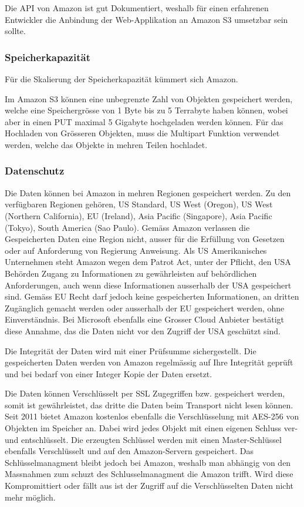 Die API von Amazon ist gut Dokumentiert, weshalb für einen erfahrenen Entwickler die Anbindung der Web-Applikation an Amazon S3 umsetzbar sein sollte.

\subsubsection*{Speicherkapazität}
Für die Skalierung der Speicherkapazität kümmert sich Amazon.

Im Amazon S3 können eine unbegrenzte Zahl von Objekten gespeichert werden, welche eine Speichergrösse von 1 Byte bis zu 5 Terrabyte haben können, wobei aber in einen PUT maximal 5 Gigabyte hochgeladen werden können. Für das Hochladen von Grösseren Objekten, muss die Multipart Funktion verwendet werden, welche das Objekte in mehren Teilen hochladet.\cite{Amazon2012b}

\subsubsection*{Datenschutz}
Die Daten können bei Amazon in mehren Regionen gespeichert werden. Zu den verfügbaren Regionen gehören, US Standard, US West (Oregon), US West (Northern California), EU (Ireland), Asia Pacific (Singapore), Asia Pacific (Tokyo), South America (Sao Paulo). Gemäss Amazon verlassen die Gespeicherten Daten eine Region nicht, ausser für die Erfüllung von Gesetzen oder auf Anforderung von Regierung Anweisung. Als US Amerikanisches Unternehmen steht Amazon wegen dem Patrot Act, unter der Pflicht, den USA Behörden Zugang zu Informationen zu gewährleisten auf behördlichen Anforderungen, auch wenn diese Informationen ausserhalb der USA gespeichert sind. Gemäss EU Recht darf jedoch keine gespeicherten Informationen, an dritten Zugänglich gemacht werden oder ausserhalb der EU gespeichert werden, ohne Einverständnis. Bei Microsoft ebenfalls eine Grosser Cloud Anbieter bestätigt diese Annahme, das die Daten nicht vor den Zugriff der USA geschützt sind.\cite{Amazon2012}\cite{Ostler}

Die Integrität der Daten wird mit einer Prüfsumme sichergestellt. Die gespeicherten Daten werden von Amazon regelmässig auf Ihre Integrität geprüft und bei bedarf von einer Integer Kopie der Daten ersetzt. 

Die Daten können Verschlüsselt per SSL Zugegriffen bzw. gespeichert werden, somit ist gewährleistet, das dritte die Daten beim Transport nicht lesen können. Seit 2011 bietet Amazon kostenlos ebenfalls die Verschlüsselung mit AES-256 von Objekten im Speicher an. Dabei wird jedes Objekt mit einen eigenen Schluss ver- und entschlüsselt. Die erzeugten Schlüssel werden mit einen Master-Schlüssel ebenfalls Verschlüsselt und auf den Amazon-Servern gespeichert. Das Schlüsselmanagment bleibt jedoch bei Amazon, weshalb man abhängig von den Massnahmen zum schuzt des Schlusselmanagment die Amazon trifft. Wird diese Kompromittiert oder fällt aus ist der Zugriff auf die Verschlüsselten Daten nicht mehr möglich.\cite{RobertLippert2011}

